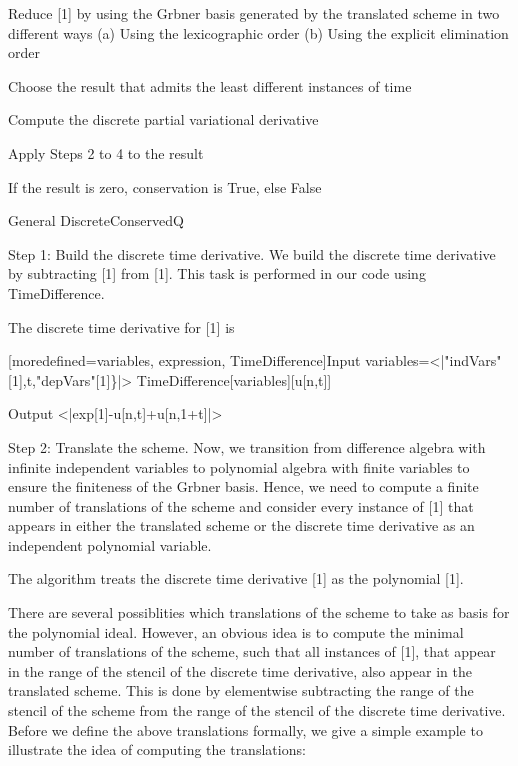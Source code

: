 \documentclass{article}
\begin{document}
{	 Reduce [1] by using {  the Gr{}bner basis} generated by the translated scheme in two different ways
	 (a) Using the lexicographic order
	 (b) Using the explicit elimination order
	
	 Choose the result that admits the least different instances of time
	
	 Compute the discrete partial variational derivative
	
	 Apply Steps 2 to 4 to the result
	
	 If the result is zero, conservation is {True}, else {False}
	
	{{General DiscreteConservedQ}}
	


{Step 1: Build the discrete time derivative.}
We build the discrete time derivative by subtracting [1] from [1]. This task is performed in our code using {TimeDifference}.

	The discrete time derivative for [1] is
	
	
	
		[moredefined={variables, expression, TimeDifference}]{Input}
  variables=<|"indVars"[1],t,"depVars"[1]\}|>
  TimeDifference[variables][u[n,t]]
  

		{Output}
  <|exp[1]-u[n,t]+u[n,1+t]|>

	

	
{Step 2: Translate the scheme.}
Now, we transition from difference algebra with infinite independent variables to polynomial algebra with finite variables to ensure the finiteness of the Gr{}bner basis. 
Hence, we need to compute a finite number of translations of the scheme and consider every instance of [1] that appears in either the translated scheme or the discrete time derivative as an independent polynomial variable.

	The algorithm treats the discrete time derivative [1]
	as the polynomial [1].

There are several possiblities which translations of the scheme to take as basis for the polynomial ideal. However, an obvious idea is to compute the minimal number of translations of the scheme, such that all instances of [1], that appear in the range of the stencil of the discrete time derivative, also appear in the translated scheme.
This is done by elementwise subtracting the range of the stencil of the scheme from the range of the stencil of the discrete time derivative. Before we define the above translations formally, we give a simple example to illustrate the idea of computing the translations:

}
\end{document}
